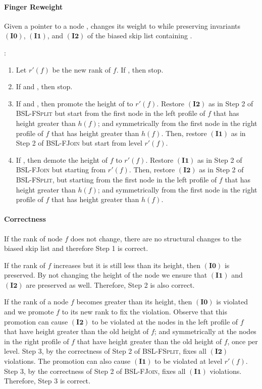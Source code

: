\documentclass[11pt]{article}
\newcommand{\Bslfspl}{\mbox{\textsc{BSL-FSplit}}}
\newcommand{\Bslfjoin}{\mbox{\textsc{BSL-FJoin}}}
\newcommand{\invzero}{\ensuremath{\mathbf{(I0)}}}
\newcommand{\invone}{\ensuremath{\mathbf{(I1)}}}
\newcommand{\invtwo}{\ensuremath{\mathbf{(I2)}}}
\newcommand{\nodeheight}[1]{\ensuremath{h(#1)}}
\newcommand{\nodenewrank}[1]{\ensuremath{r'(\node #1)}}
\newcommand{\node}[1]{\ensuremath{#1}}
\begin{document}
\paragraph{Finger Reweight} 
Given a pointer to a node , changes its weight to  while preserving invariants \invzero{}, \invone{}, and \invtwo{} of the biased skip list containing . 


\vspace{5mm} 
\noindent: 
\begin{enumerate} 
\item Let \nodenewrank f be the new rank of \node f. If , then stop. 
\item If  and , then stop. 
\item If  and , then promote the height of  to \nodenewrank f. Restore \invtwo{} as in Step 2 of \Bslfspl{} but start from the first node in the left profile of \node f that has height greater than \nodeheight f; and symmetrically from the first node in the right profile of \node f that has height greater than \nodeheight f. Then, restore \invone{} as in Step 2 of \Bslfjoin{} but start from level \nodenewrank f. 
\item If , then demote the height of \node f to \nodenewrank f. Restore \invone{} as in Step 2 of \Bslfjoin{} but starting from \nodenewrank f. Then, restore \invtwo{} as in Step 2 of \Bslfspl{}, but starting from the first node in the left profile of \node f that has height greater than \nodeheight f; and symmetrically from the first node in the right profile of \node f that has height greater than \nodeheight f. 
\end{enumerate} 

\paragraph{Correctness} If the rank of node \node f does not change, there are no structural changes to the biased skip list and therefore Step 1 is correct. 

If the rank of \node f increases but it is still less than its height, then \invzero{} is preserved. By not changing the height of the node we ensure that \invone{} and \invtwo{} are preserved as well. Therefore, Step 2 is also correct. 


If the rank of a node \node f becomes greater than its height, then \invzero{} is violated and we promote \node f to its new rank to fix the violation. Observe that this promotion can cause \invtwo{} to be violated at the nodes in the left profile of \node f that have height greater than the old height of \node f; and symmetrically at the nodes in the right profile of \node f that have height greater than the old height of \node f, once per level. Step 3, by the correctness of Step 2 of \Bslfspl{}, fixes all \invtwo{} violations. The promotion can also cause \invone{} to be violated at level \nodenewrank f. Step 3, by the correctness of Step 2 of \Bslfjoin{}, fixes all \invone{} violations. Therefore, Step 3 is correct. 
\end{document}
